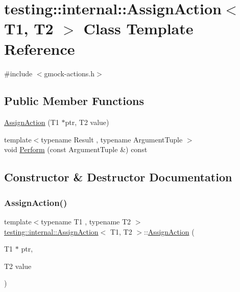 \hypertarget{classtesting_1_1internal_1_1_assign_action}{}\section{testing\+:\+:internal\+:\+:Assign\+Action$<$ T1, T2 $>$ Class Template Reference}
\label{classtesting_1_1internal_1_1_assign_action}


{\ttfamily \#include $<$gmock-\/actions.\+h$>$}

\subsection*{Public Member Functions}
\begin{DoxyCompactItemize}
\item 
\hyperlink{classtesting_1_1internal_1_1_assign_action_ae5a8fe8954ff3f8b26a08b57c3afdf9a}{Assign\+Action} (T1 $\ast$ptr, T2 value)
\item 
{\footnotesize template$<$typename Result , typename Argument\+Tuple $>$ }\\void \hyperlink{classtesting_1_1internal_1_1_assign_action_a540912bec1f4de6fc4c7de26312e4586}{Perform} (const Argument\+Tuple \&) const
\end{DoxyCompactItemize}


\subsection{Constructor \& Destructor Documentation}
\mbox{\label{classtesting_1_1internal_1_1_assign_action_ae5a8fe8954ff3f8b26a08b57c3afdf9a}} 
\subsubsection{\texorpdfstring{Assign\+Action()}{AssignAction()}}
{\footnotesize\ttfamily template$<$typename T1 , typename T2 $>$ \\
\hyperlink{classtesting_1_1internal_1_1_assign_action}{testing\+::internal\+::\+Assign\+Action}$<$ T1, T2 $>$\+::\hyperlink{classtesting_1_1internal_1_1_assign_action}{Assign\+Action} (\begin{DoxyParamCaption}\item[{T1 $\ast$}]{ptr,  }\item[{T2}]{value }\end{DoxyParamCaption})\hspace{0.3cm}{\ttfamily [inline]}}



